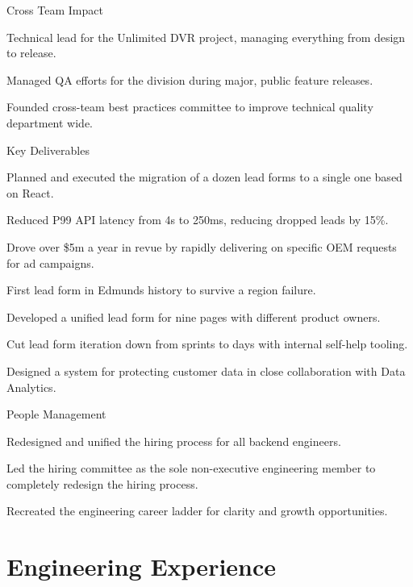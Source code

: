 \documentclass[]{deedy-resume-openfont}
\begin{document}
Cross Team Impact
\begin{tightemize}
\item Technical lead for the Unlimited DVR project, managing everything from design to release.
\item Managed QA efforts for the division during major, public feature releases.
\item Founded cross-team best practices committee to improve technical quality department wide.
\end{tightemize}
\sectionsep

\vspace{\topsep}
Key Deliverables
\begin{tightemize}
\item Planned and executed the migration of a dozen lead forms to a single one based on React.
\item Reduced P99 API latency from 4s to 250ms, reducing dropped leads by 15\%.
\item Drove over \$5m a year in revue by rapidly delivering on specific OEM requests for ad campaigns.
\item First lead form in Edmunds history to survive a region failure.
\item Developed a unified lead form for nine pages with different product owners.
\item Cut lead form iteration down from sprints to days with internal self-help tooling.
\item Designed a system for protecting customer data in close collaboration with Data Analytics.
\end{tightemize}
\sectionsep
People Management
\begin{tightemize}
  \item Redesigned and unified the hiring process for all backend engineers.
  \item Led the hiring committee as the sole non-executive engineering member to completely redesign the hiring process.
  \item Recreated the engineering career ladder for clarity and growth opportunities.
\end{tightemize}


\section{Engineering Experience}
\end{document}

